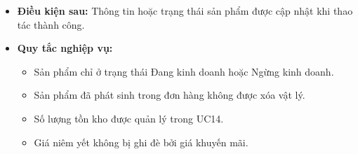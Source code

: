 \begin{itemize}
    \item \textbf{Điều kiện sau:} Thông tin hoặc trạng thái sản phẩm được cập nhật khi thao tác thành công.
    \item \textbf{Quy tắc nghiệp vụ:}
    \begin{itemize}
        \item Sản phẩm chỉ ở trạng thái Đang kinh doanh hoặc Ngừng kinh doanh.
        \item Sản phẩm đã phát sinh trong đơn hàng không được xóa vật lý.
        \item Số lượng tồn kho được quản lý trong UC14.
        \item Giá niêm yết không bị ghi đè bởi giá khuyến mãi.
    \end{itemize}
\end{itemize}

